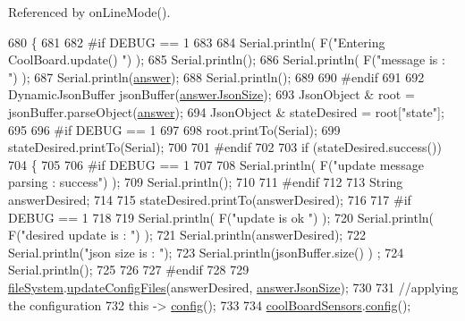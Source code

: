 Referenced by on\+Line\+Mode().


\begin{DoxyCode}
680 \{
681 
682 \textcolor{preprocessor}{#if DEBUG == 1}
683 
684     Serial.println( F(\textcolor{stringliteral}{"Entering CoolBoard.update() "}) );
685     Serial.println();
686     Serial.println( F(\textcolor{stringliteral}{"message is : "}) );
687     Serial.println(\hyperlink{classCoolBoard_a7b835fafd449e5282f7f91d787a2dc15}{answer});
688     Serial.println();
689 
690 \textcolor{preprocessor}{#endif}
691 
692     DynamicJsonBuffer jsonBuffer(\hyperlink{classCoolBoard_af2da1f85315b3d074a8b87d158094fb7}{answerJsonSize});
693     JsonObject & root = jsonBuffer.parseObject(\hyperlink{classCoolBoard_a7b835fafd449e5282f7f91d787a2dc15}{answer});
694     JsonObject & stateDesired = root[\textcolor{stringliteral}{"state"}];
695 
696 \textcolor{preprocessor}{#if DEBUG == 1}
697     
698     root.printTo(Serial);
699     stateDesired.printTo(Serial);
700 
701 \textcolor{preprocessor}{#endif}
702 
703     \textcolor{keywordflow}{if} (stateDesired.success())
704     \{
705     
706 \textcolor{preprocessor}{    #if DEBUG == 1}
707 
708         Serial.println( F(\textcolor{stringliteral}{"update message parsing : success"}) );
709         Serial.println();
710     
711 \textcolor{preprocessor}{    #endif}
712 
713             String answerDesired;
714         
715             stateDesired.printTo(answerDesired);
716             
717 \textcolor{preprocessor}{        #if DEBUG == 1      }
718         
719             Serial.println( F(\textcolor{stringliteral}{"update is ok "}) );
720             Serial.println( F(\textcolor{stringliteral}{"desired update is : "}) );            
721             Serial.println(answerDesired);
722             Serial.println(\textcolor{stringliteral}{"json size is : "});
723             Serial.println(jsonBuffer.size() ) ;                
724             Serial.println();
725 
726         
727 \textcolor{preprocessor}{        #endif}
728             
729             \hyperlink{classCoolBoard_a42c2586fbb13ff7f06538e9284e8538d}{fileSystem}.\hyperlink{classCoolFileSystem_a32dad79ae80182a83e2e8f52286b7c7b}{updateConfigFiles}(answerDesired, 
      \hyperlink{classCoolBoard_af2da1f85315b3d074a8b87d158094fb7}{answerJsonSize});
730 
731             \textcolor{comment}{//applying the configuration    }
732             \textcolor{keyword}{this} -> \hyperlink{classCoolBoard_a583a874c09c07e70a6eb9229fc4beddb}{config}();
733 
734             \hyperlink{classCoolBoard_af102be5288bd7f7a8e59b13f86e26a00}{coolBoardSensors}.\hyperlink{classCoolBoardSensors_a9a218895c5423375c33c08f2c56fb23a}{config}();

\end{DoxyCode}
